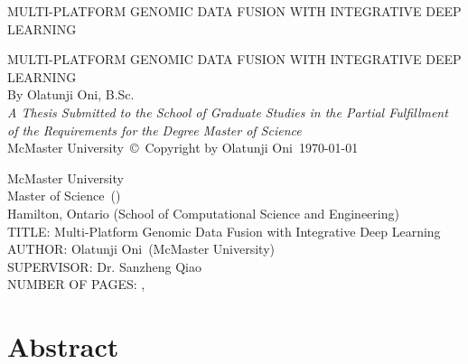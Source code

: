 \documentclass[12pt, twoside]{report}
\begin{document}
\thispagestyle{empty}
\vspace*{\fill}
\begin{center}
\textsc{\Large MULTI-PLATFORM GENOMIC DATA FUSION WITH INTEGRATIVE DEEP LEARNING}
\end{center}
\vspace*{\fill}

\setcounter{page}{0}
\clearpage

\thispagestyle{empty}
\begin{center}
    \vfill
    \textsc{\Large MULTI-PLATFORM GENOMIC DATA FUSION WITH INTEGRATIVE DEEP LEARNING}\\
    \vfill
    By Olatunji Oni, B.Sc. \\
    \vfill
    {\large \textit{A Thesis Submitted to the School of Graduate Studies in the Partial Fulfillment of the Requirements for the Degree Master of Science}}\\

    \vfill
    {\large McMaster University\, \copyright\, Copyright by Olatunji Oni\, \today}\\[4cm]
\end{center}

\newpage
{}
\setcounter{page}{2}

\begin{singlespace}
    \noindent
    McMaster University \\ 
    Master of Science\, (\the\year) \\
    Hamilton, Ontario (School of Computational Science and Engineering) \\[1.5cm]
    TITLE: Multi-Platform Genomic Data Fusion with Integrative Deep Learning \\
    AUTHOR: Olatunji Oni\,  %
    (McMaster University)  \\
    SUPERVISOR: Dr. Sanzheng Qiao\, \\ 
    NUMBER OF PAGES: \pageref{lastoffront}, \pageref{LastPage}
\end{singlespace}

\clearpage
\section*{\Huge Abstract} 
    
\clearpage

\end{document}
